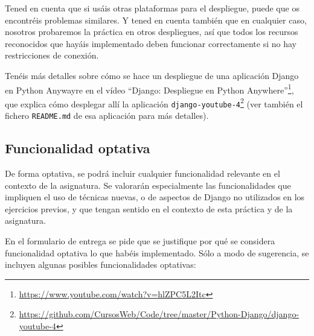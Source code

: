 Tened en cuenta que si usáis otras plataformas para el despliegue, puede que os encontréis problemas similares. Y tened en cuenta también que en cualquier caso, nosotros probaremos la práctica en otros despliegues, así que todos los recursos reconocidos que hayáis implementado deben funcionar correctamente si no hay restricciones de conexión.

Tenéis más detalles sobre cómo se hace un despliegue de una aplicación Django en Python Anywayre en el vídeo ``Django: Despliegue en Python Anywhere''\footnote{\url{https://www.youtube.com/watch?v=hlZPC5L2Itc}}, que explica cómo desplegar allí la aplicación \texttt{django-youtube-4}\footnote{\url{https://github.com/CursosWeb/Code/tree/master/Python-Django/django-youtube-4}} (ver también el fichero \texttt{README.md} de esa aplicación para más detalles).

\subsection{Funcionalidad optativa}

De forma optativa, se podrá incluir cualquier funcionalidad relevante en el contexto de la asignatura. Se valorarán especialmente las funcionalidades que impliquen el uso de técnicas nuevas, o de aspectos de Django no utilizados en los ejercicios previos, y que tengan sentido en el contexto de esta práctica y de la asignatura.

En el formulario de entrega se pide que se justifique por qué se considera funcionalidad optativa lo que habéis implementado. Sólo a modo de sugerencia, se incluyen algunas posibles funcionalidades optativas:

